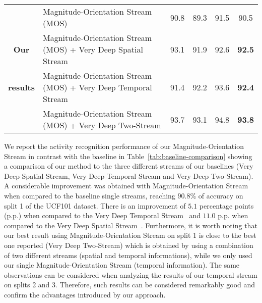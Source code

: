 \documentclass[10pt,conference]{IEEEtran}
\begin{document}
\begin{table*}[th!]
\begin{small}
\begin{tabular}{clp{1.5cm}p{1.5cm}p{1.5cm}p{1.5cm}}
			& Magnitude-Orientation Stream (MOS) & \multicolumn{1}{c}{90.8} & \multicolumn{1}{c}{{89.3}} & \multicolumn{1}{c}{91.5} & \multicolumn{1}{c}{{90.5}} \\
			\multirow{1}{*}{\textbf{Our}} & Magnitude-Orientation Stream (MOS) + Very Deep Spatial Stream & \multicolumn{1}{c}{93.1} & \multicolumn{1}{c}{{91.9}} & \multicolumn{1}{c}{92.6} & \multicolumn{1}{c}{{\textbf{92.5}}} \\
			\multirow{1}{*}{\textbf{results}} & Magnitude-Orientation Stream (MOS) + Very Deep Temporal Stream & \multicolumn{1}{c}{91.4} & \multicolumn{1}{c}{{92.2}} & \multicolumn{1}{c}{93.6} & \multicolumn{1}{c}{{\textbf{92.4}}} \\
			& Magnitude-Orientation Stream (MOS) + Very Deep Two-Stream& \multicolumn{1}{c}{93.7} & \multicolumn{1}{c}{{93.1}} & \multicolumn{1}{c}{94.8} & \multicolumn{1}{c}{{\textbf{93.8}}} \\
			\bottomrule
		\end{tabular}
		\label{tab:baseline-comparison}
	\end{small}
\end{table*}


We report the activity recognition performance of our Magnitude-Orientation Stream in contrast with the baseline in Table~\ref{tab:baseline-comparison} showing a comparison of our method to the three different streams of our baselines (Very Deep Spatial Stream, Very Deep Temporal Stream and Very Deep Two-Stream). A considerable improvement was obtained with Magnitude-Orientation Stream when compared to the baseline single streams, reaching $90.8\%$ of accuracy on split 1 of the UCF101 dataset. There is an improvement of $5.1$ percentage points (p.p.) when compared to the Very Deep Temporal Stream~\cite{Wang:2015} and $11.0$ p.p. when compared to the Very Deep Spatial Stream~\cite{Wang:2015}. Furthermore, it is worth noting that our best result using Magnitude-Orientation Stream on split 1 is close to the best one reported (Very Deep Two-Stream) which is obtained by using a combination of two different streams (spatial and temporal informations), while we only used our single Magnitude-Orientation Stream (temporal information). The same observations can be considered when analyzing the results of our temporal stream on splits 2 and 3. Therefore, such results can be considered remarkably good and confirm the advantages introduced by our approach.
\end{document}
